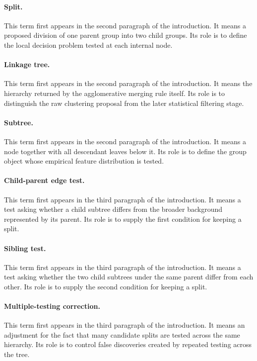 \paragraph{Split.}
This term first appears in the second paragraph of the introduction. It means a
proposed division of one parent group into two child groups. Its role is to
define the local decision problem tested at each internal node.

\paragraph{Linkage tree.}
This term first appears in the second paragraph of the introduction. It means
the hierarchy returned by the agglomerative merging rule itself. Its role is to
distinguish the raw clustering proposal from the later statistical filtering
stage.

\paragraph{Subtree.}
This term first appears in the second paragraph of the introduction. It means a
node together with all descendant leaves below it. Its role is to define the
group object whose empirical feature distribution is tested.

\paragraph{Child-parent edge test.}
This term first appears in the third paragraph of the introduction. It means a
test asking whether a child subtree differs from the broader background
represented by its parent. Its role is to supply the first condition for
keeping a split.

\paragraph{Sibling test.}
This term first appears in the third paragraph of the introduction. It means a
test asking whether the two child subtrees under the same parent differ from
each other. Its role is to supply the second condition for keeping a split.

\paragraph{Multiple-testing correction.}
This term first appears in the third paragraph of the introduction. It means an
adjustment for the fact that many candidate splits are tested across the same
hierarchy. Its role is to control false discoveries created by repeated testing
across the tree.

